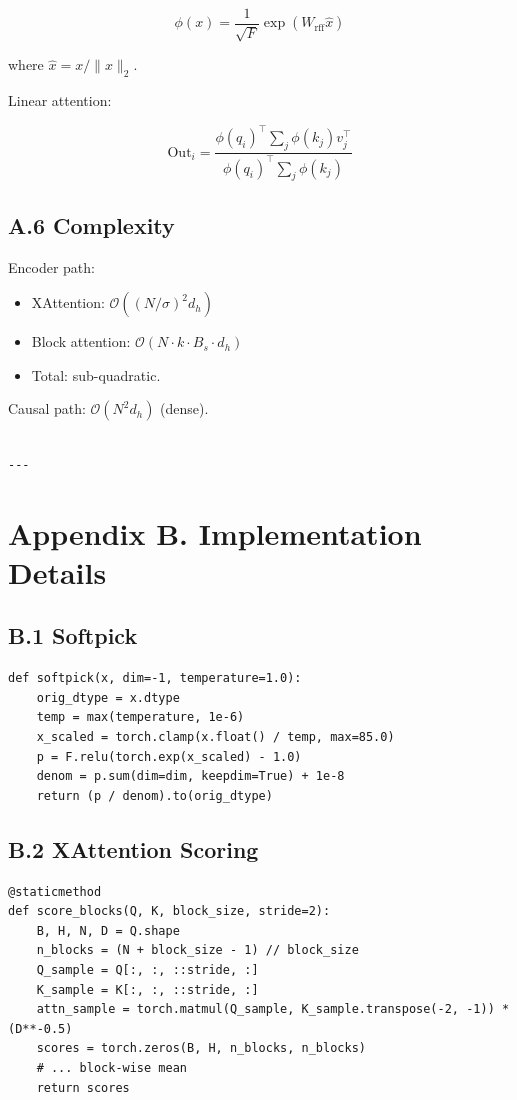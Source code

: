 \[
\phi(x) = \frac{1}{\sqrt{F}} \exp(W_\text{rff} \hat{x})
\tag{A.6}
\]

where $\hat{x} = x / \|x\|_2$.

Linear attention:

\[
\text{Out}_i = \frac{\phi(q_i)^\top \sum_j \phi(k_j) v_j^\top}{\phi(q_i)^\top \sum_j \phi(k_j)}
\tag{A.7}
\]

\subsection{A.6 Complexity}

Encoder path:
\begin{itemize}
\item XAttention: $\mathcal{O}((N/\sigma)^2 d_h)$
\item Block attention: $\mathcal{O}(N \cdot k \cdot B_s \cdot d_h)$
\item Total: sub-quadratic.

\end{itemize}
Causal path: $\mathcal{O}(N^2 d_h)$ (dense).
\begin{lstlisting}

---
\end{lstlisting}

\section{Appendix B. Implementation Details}

\subsection{B.1 Softpick}

\begin{lstlisting}
def softpick(x, dim=-1, temperature=1.0):
    orig_dtype = x.dtype
    temp = max(temperature, 1e-6)
    x_scaled = torch.clamp(x.float() / temp, max=85.0)
    p = F.relu(torch.exp(x_scaled) - 1.0)
    denom = p.sum(dim=dim, keepdim=True) + 1e-8
    return (p / denom).to(orig_dtype)
\end{lstlisting}

\subsection{B.2 XAttention Scoring}

\begin{lstlisting}
@staticmethod
def score_blocks(Q, K, block_size, stride=2):
    B, H, N, D = Q.shape
    n_blocks = (N + block_size - 1) // block_size
    Q_sample = Q[:, :, ::stride, :]
    K_sample = K[:, :, ::stride, :]
    attn_sample = torch.matmul(Q_sample, K_sample.transpose(-2, -1)) * (D**-0.5)
    scores = torch.zeros(B, H, n_blocks, n_blocks)
    # ... block-wise mean
    return scores
\end{lstlisting}

